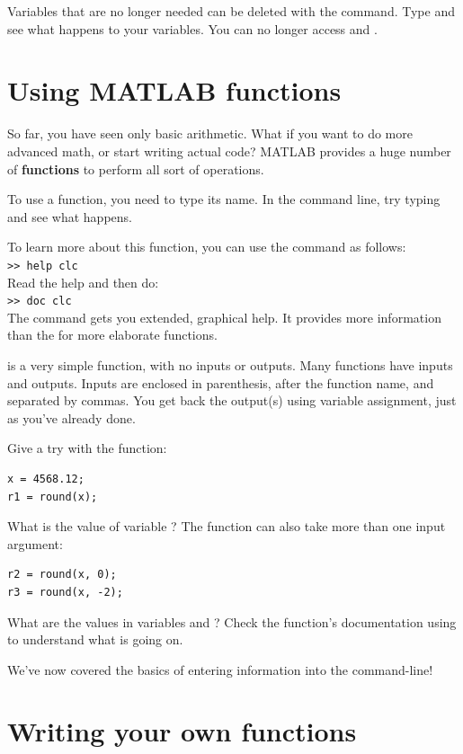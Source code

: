 \documentclass{article}
\begin{document}
Variables that are no longer needed can be deleted with the  command.
Type  and see what happens to your variables. You can no longer access
 and .

\pagebreak


\section{Using MATLAB functions}

So far, you have seen only basic arithmetic.
What if you want to do more advanced math, or start writing actual code?
MATLAB provides a huge number of \textbf{functions} to perform all sort of operations.

To use a function, you need to type its name.
In the command line, try typing  and see what happens.

To learn more about this function, you can use the  command as follows: \\
\verb|>> help clc| \\
Read the help and then do:\\
\verb|>> doc clc| \\
The  command gets you extended, graphical help. It provides more information than the  for more elaborate functions.


 is a very simple function, with no inputs or outputs.
Many functions have inputs and outputs.
Inputs are enclosed in parenthesis, after the function name, and separated by commas.
You get back the output(s) using variable assignment, just as you've already done.

Give a try with the  function:
\begin{lstlisting}
x = 4568.12;
r1 = round(x);
\end{lstlisting}
What is the value of variable ? The  function can also take more than one input argument:
\begin{lstlisting}
r2 = round(x, 0);
r3 = round(x, -2);
\end{lstlisting}
What are the values in variables  and ?
Check the function's documentation using  to understand what is going on.

We've now covered the basics of entering information into the command-line!

\pagebreak
\section{Writing your own functions}
\end{document}
